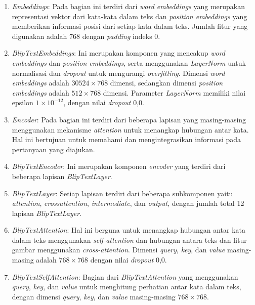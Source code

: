 \begin{enumerate}

  \item \textit{Embeddings}: Pada bagian ini terdiri dari \textit{word embeddings} yang merupakan representasi vektor dari kata-kata dalam teks dan \textit{position embeddings} yang memberikan informasi posisi dari setiap kata dalam teks. Jumlah fitur yang digunakan adalah 768 dengan \textit{padding} indeks 0.

  \item \textit{BlipTextEmbeddings}: Ini merupakan komponen yang mencakup \textit{word embeddings} dan \textit{position embeddings}, serta menggunakan \textit{LayerNorm} untuk normalisasi dan \textit{dropout} untuk mengurangi \textit{overfitting}. Dimensi \textit{word embeddings} adalah $30524 \times 768$ dimensi, sedangkan dimensi \textit{position embeddings} adalah $512 \times 768$ dimensi. Parameter \textit{LayerNorm} memiliki nilai epsilon $1 \times 10^{-12}$, dengan nilai \textit{dropout} 0,0.

  \item \textit{Encoder}: Pada bagian ini terdiri dari beberapa lapisan yang masing-masing menggunakan mekanisme \textit{attention} untuk menangkap hubungan antar kata. Hal ini bertujuan untuk memahami dan mengintegrasikan informasi pada pertanyaan yang diajukan.

  \item \textit{BlipTextEncoder}: Ini merupakan komponen \textit{encoder} yang terdiri dari beberapa lapisan \textit{BlipTextLayer}. 

  \item \textit{BlipTextLayer}: Setiap lapisan terdiri dari beberapa subkomponen yaitu \textit{attention}, \textit{crossattention}, \textit{intermediate}, dan \textit{output}, dengan jumlah total 12 lapisan \textit{BlipTextLayer}.

  \item \textit{BlipTextAttention}: Hal ini berguna untuk menangkap hubungan antar kata dalam teks menggunakan \textit{self-attention} dan hubungan antara teks dan fitur gambar menggunakan \textit{cross-attention}. Dimensi \textit{query}, \textit{key}, dan \textit{value} masing-masing adalah $768 \times 768$ dengan nilai \textit{dropout} 0,0.

  \item \textit{BlipTextSelfAttention}: Bagian dari \textit{BlipTextAttention} yang menggunakan \textit{query}, \textit{key}, dan \textit{value} untuk menghitung perhatian antar kata dalam teks, dengan dimensi \textit{query}, \textit{key}, dan \textit{value} masing-masing $768 \times 768$.


\end{enumerate}
